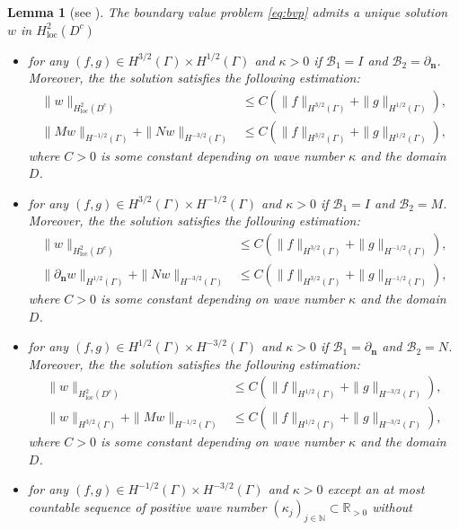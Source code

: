 \documentclass[10pt,a4paper]{article}
\numberwithin{equation}{section}
\newtheorem{lemma}[theorem]{Lemma}
\begin{document}
\begin{lemma}[see \cite{bourgeois_well_2020}]
  \label{lem:well}
  The boundary value problem \eqref{eq:bvp} admits a unique solution $w$ in $H^{2}_{\mathrm{ loc } }(D^c)$
  \begin{itemize}
  \item for any  $(f,g)\in H^{3/2}(\Gamma)\times H^{1/2}(\Gamma)$ and  $\kappa>0$ if $\mathcal{B}_1=I$ and $\mathcal{B}_2=\partial_{\bm{n} }$. Moreover, the the solution satisfies the following estimation:
    \begin{align*}
  \|w\|_{H^2_{\mathrm{loc}}(D^{c})} 
 & \leq C (\|f \|_{H^{3/2}(\Gamma)} + \|g \|_{H^{1/2}(\Gamma)}),\\
 \|M w\|_{H^{-1/2}(\Gamma)} + \|N w \|_{H^{-3/2}(\Gamma)}
 &\leq C (\|f \|_{H^{3/2}(\Gamma)} + \|g \|_{H^{1/2}(\Gamma)}),
\end{align*}
where $C>0$ is some constant depending on wave number $\kappa$ and the domain $D$.
%
    \item for any  $(f,g)\in H^{3/2}(\Gamma)\times H^{-1/2}(\Gamma)$ and  $\kappa>0$ if $\mathcal{B}_1=I$ and $\mathcal{B}_2=M$. Moreover, the the solution satisfies the following estimation:
    \begin{align*}
  \|w\|_{H^2_{\mathrm{loc}}(D^{c})} 
 & \leq C (\|f \|_{H^{3/2}(\Gamma)} + \|g \|_{H^{-1/2}(\Gamma)}),\\
 \|\partial_{\bm{n} } w\|_{H^{1/2}(\Gamma)} + \|N w \|_{H^{-3/2}(\Gamma)}
 &\leq C (\|f \|_{H^{3/2}(\Gamma)} + \|g \|_{H^{-1/2}(\Gamma)}),
    \end{align*}
    where $C>0$ is some constant depending on wave number $\kappa$ and the domain $D$.
\item for any  $(f,g)\in H^{1/2}(\Gamma)\times H^{-3/2}(\Gamma)$ and  $\kappa>0$ if $\mathcal{B}_1=\partial_{\bm{n} } $ and $\mathcal{B}_2=N$. Moreover, the the solution satisfies the following estimation:
    \begin{align*}
  \|w\|_{H^2_{\mathrm{loc}}(D^{c})} 
 & \leq C (\|f \|_{H^{1/2}(\Gamma)} + \|g \|_{H^{-3/2}(\Gamma)}),\\
 \| w\|_{H^{3/2}(\Gamma)} + \|M w \|_{H^{-1/2}(\Gamma)}
 &\leq C (\|f \|_{H^{1/2}(\Gamma)} + \|g \|_{H^{-3/2}(\Gamma)}),
    \end{align*}
    where $C>0$ is some constant depending on wave number $\kappa$ and the domain $D$.
    \item for any  $(f,g)\in H^{-1/2}(\Gamma)\times H^{-3/2}(\Gamma)$ and  $\kappa>0$ except an at most countable sequence of positive wave number $(\kappa_j)_{j\in  \mathbb{N}} \subset \mathbb{R}_{>0}$ without

\end{itemize}
\end{lemma}
\end{document}
